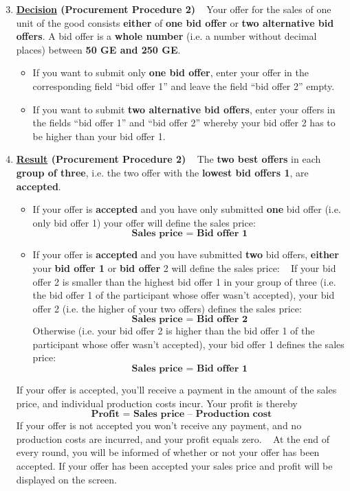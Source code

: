 \documentclass[11pt]{article}
\begin{document}

\begin{enumerate}[label=\textbf{\upshape(\arabic*\upshape)}] \setcounter{enumi}{2}
	\item \textbf{\underline{Decision} (Procurement Procedure 2)} ~\smallbreak
		Your offer for the sales of one unit of the good consists \textbf{either} of \textbf{one bid offer} or \textbf{two alternative bid offers}. A bid offer is a \textbf{whole number} (i.e. a number without decimal places) between \textbf{50 GE and 250 GE}. 
		\begin{itemize}
			\item If you want to submit only \textbf{one bid offer}, enter your offer in the corresponding field \enquote{bid offer 1} and leave the field \enquote{bid offer 2} empty.
			\item If you want to submit \textbf{two alternative bid offers}, enter your offers in the fields \enquote{bid offer 1} and \enquote{bid offer 2} whereby your bid offer 2 has to be higher than your bid offer 1.
		\end{itemize}
	\item \textbf{\underline{Result} (Procurement Procedure 2)} ~\smallbreak
		The \textbf{two best offers} in each \textbf{group of three}, i.e. the two offer with the \textbf{lowest bid offers 1}, are \textbf{accepted}.
		\begin{itemize}
			\item If your offer is \textbf{accepted} and you have only submitted \textbf{one} bid offer (i.e. only bid offer 1) your offer will define the sales price:
			$$ \textbf{Sales price = Bid offer 1} $$
			\item If your offer is \textbf{accepted} and you have submitted \textbf{two} bid offers, \textbf{either} your \textbf{bid offer 1} or \textbf{bid offer} 2 will define the sales price: ~\medbreak
			If your bid offer 2 is smaller than the highest bid offer 1 in your group of three (i.e. the bid offer 1 of the participant whose offer wasn’t accepted), your bid offer 2 (i.e. the higher of your two offers) defines the sales price:
				$$ \textbf{Sales price = Bid offer 2} $$
			Otherwise (i.e. your bid offer 2 is higher than the bid offer 1 of the participant whose offer wasn’t accepted), your bid offer 1 defines the sales price:
 				$$ \textbf{Sales price = Bid offer 1} $$
		\end{itemize}
		If your offer is accepted, you’ll receive a payment in the amount of the sales price, and individual production costs incur. Your profit is thereby
		$$ \textbf{Profit = Sales price – Production cost} $$
		If your offer is not accepted you won’t receive any payment, and no production costs are incurred, and your profit equals zero. ~\smallbreak
		At the end of every round, you will be informed of whether or not your offer has been accepted. If your offer has been accepted your sales price and profit will be displayed on the screen.
\end{enumerate}
\end{document}
